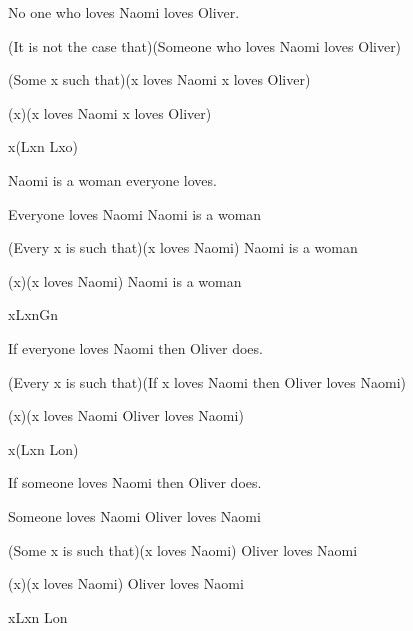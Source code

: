 \begin{argument}
\item[\textbf{(8)}] No one who loves Naomi loves Oliver.
\item[$\simeq$] (It is not the case that)(Someone who loves Naomi loves Oliver)
\item[$\simeq$] \enot(Some x such that)(x loves Naomi \eand x loves Oliver)
\item[$\simeq$] \enot(\eexists x)(x loves Naomi \eand x loves Oliver)
\item[$\simeq$] \enot\eexists x(Lxn \eand Lxo)
\end{argument}

\begin{argument}
\item[\textbf{(9)}] Naomi is a woman everyone loves.
\item[$\simeq$] Everyone loves Naomi \eand Naomi is a woman
\item[$\simeq$] (Every x is such that)(x loves Naomi) \eand Naomi is a woman
\item[$\simeq$] (\eforall x)(x loves Naomi) \eand Naomi is a woman
\item[$\simeq$] \eforall xLxn\eand Gn
\end{argument}

\begin{argument}
\item[\textbf{(10)}] If everyone loves Naomi then Oliver does.
\item[$\simeq$] (Every x is such that)(If x loves Naomi then Oliver loves Naomi)
\item[$\simeq$] (\eforall x)(x loves Naomi \eif Oliver loves Naomi)
\item[$\simeq$] \eforall x(Lxn \eif Lon)
\end{argument}

\begin{argument}
\item[\textbf{(11)}] If someone loves Naomi then Oliver does.
\item[$\simeq$] Someone loves Naomi \eif Oliver loves Naomi
\item[$\simeq$] (Some x is such that)(x loves Naomi) \eif Oliver loves Naomi
\item[$\simeq$] (\eexists x)(x loves Naomi) \eif Oliver loves Naomi
\item[$\simeq$] \eexists xLxn \eif Lon
\end{argument}

